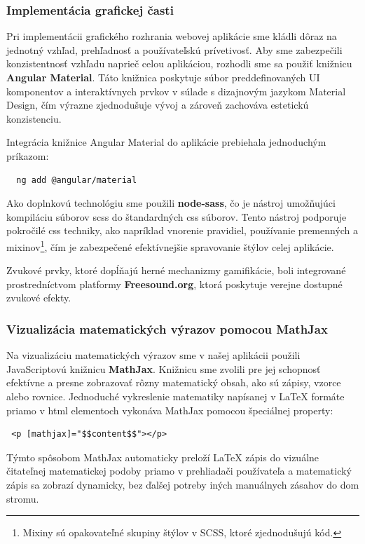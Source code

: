 \subsubsection{Implementácia grafickej časti}
Pri implementácii grafického rozhrania webovej aplikácie sme kládli dôraz na jednotný vzhľad, prehľadnosť a používateľskú prívetivosť.
 Aby sme zabezpečili konzistentnosť vzhľadu naprieč celou aplikáciou, rozhodli sme sa použiť knižnicu \textbf{Angular Material}.
  Táto knižnica poskytuje súbor preddefinovaných UI komponentov a interaktívnych prvkov v súlade s dizajnovým jazykom Material Design, čím výrazne zjednodušuje vývoj a zároveň zachováva estetickú konzistenciu.

Integrácia knižnice Angular Material do aplikácie prebiehala jednoduchým príkazom:

\begin{verbatim}
  ng add @angular/material
\end{verbatim}

Ako doplnkovú technológiu sme použili \textbf{node-sass}, čo je nástroj umožňujúci kompiláciu súborov \acrshort{scss} do štandardných \acrshort{css} súborov.
 Tento nástroj podporuje pokročilé \acrshort{css} techniky, ako napríklad vnorenie pravidiel, používanie premenných a mixinov\footnote{Mixiny sú opakovateľné skupiny štýlov v SCSS, ktoré zjednodušujú kód.}, čím je zabezpečené efektívnejšie spravovanie štýlov celej aplikácie.

 Zvukové prvky, ktoré dopĺňajú herné mechanizmy gamifikácie, boli integrované prostredníctvom platformy \textbf{Freesound.org}\cite{freesong}, ktorá poskytuje verejne dostupné zvukové efekty.
 
 \subsubsection{Vizualizácia matematických výrazov pomocou MathJax }
 Na vizualizáciu matematických výrazov sme v našej aplikácii použili JavaScriptovú knižnicu \textbf{MathJax}. 
 Knižnicu sme zvolili pre jej schopnosť efektívne a presne zobrazovať rôzny matematický obsah, ako sú zápisy, vzorce alebo rovnice. 
 Jednoduché vykreslenie matematiky napísanej v LaTeX formáte priamo v \acrshort{html} elementoch vykonáva MathJax pomocou špeciálnej property:

\begin{verbatim}
 <p [mathjax]="$$content$$"></p>
  \end{verbatim}
 Týmto spôsobom MathJax automaticky preloží LaTeX zápis do vizuálne čitateľnej matematickej podoby priamo v prehliadači používateľa a matematický zápis sa zobrazí dynamicky, bez ďalšej potreby iných manuálnych zásahov do \acrshort{dom} stromu.

